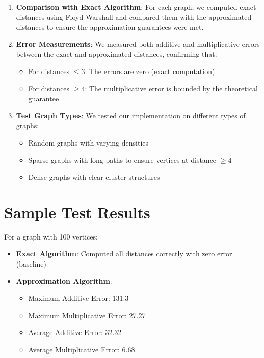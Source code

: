 \documentclass[a4paper,11pt,oneside]{book}
\begin{document}
\begin{enumerate}
    \item \textbf{Comparison with Exact Algorithm}: For each graph, we computed exact distances using Floyd-Warshall and compared them with the approximated distances to ensure the approximation guarantees were met.

    \item \textbf{Error Measurements}: We measured both additive and multiplicative errors between the exact and approximated distances, confirming that:
    \begin{itemize}
        \item For distances $\leq 3$: The errors are zero (exact computation)
        \item For distances $\geq 4$: The multiplicative error is bounded by the theoretical guarantee
    \end{itemize}

    \item \textbf{Test Graph Types}: We tested our implementation on different types of graphs:
    \begin{itemize}
        \item Random graphs with varying densities
        \item Sparse graphs with long paths to ensure vertices at distance $\geq 4$
        \item Dense graphs with clear cluster structures
    \end{itemize}
\end{enumerate}

\section*{Sample Test Results}

For a graph with 100 vertices:
\begin{itemize}
    \item \textbf{Exact Algorithm}: Computed all distances correctly with zero error (baseline)
    \item \textbf{Approximation Algorithm}:
    \begin{itemize}
        \item Maximum Additive Error: 131.3
        \item Maximum Multiplicative Error: 27.27
        \item Average Additive Error: 32.32
        \item Average Multiplicative Error: 6.68
    \end{itemize}
\end{itemize}
\end{document}
